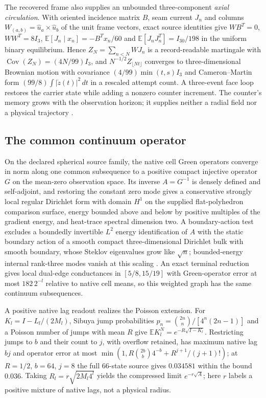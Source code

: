 \documentclass[11pt]{article}
\theoremstyle{definition}
\theoremstyle{remark}
\theoremstyle{plain}
\newcommand{\Ex}{\mathbb{E}}
\begin{document}
The recovered frame also supplies an unbounded three-component \emph{axial
circulation}. With oriented incidence matrix $B$, seam current $J_n$ and
columns $W_{(a,b)}=\hat u_a\times\hat u_b$ of the unit frame vectors, exact
source identities give $WB^T=0$, $WW^T=8I_3$, $\Ex[J_n\mid x_n]=-B^Tx_n/60$
and $\Ex[J_nJ_n^T]=I_{30}/198$ in the uniform binary equilibrium. Hence
$Z_N=\sum_{n<N}WJ_n$ is a record-readable martingale with
$\operatorname{Cov}(Z_N)=(4N/99)I_3$, and
$N^{-1/2}Z_{\lfloor Nt\rfloor}$ converges to three-dimensional Brownian
motion with covariance $(4/99)\min(t,s)I_3$ and Cameron--Martin form
$(99/8)\int|\dot z(t)|^2\,dt$ in a rescaled attempt count. A three-event face
loop restores the carrier state while adding a nonzero counter increment.
The counter's memory grows with the observation horizon; it supplies neither
a radial field nor a physical trajectory \cite{nativeContinuum}.

\subsection{The common continuum operator}
\label{sec:continuum}

On the declared spherical source family, the native cell Green operators
converge in norm along one common subsequence to a positive compact
injective operator $G$ on the mean-zero observation space. Its inverse
$A=G^{-1}$ is densely defined and self-adjoint, and restoring the constant
zero mode gives a conservative strongly local regular Dirichlet form with
domain $H^1$ on the supplied flat-polyhedron comparison surface, energy
bounded above and below by positive multiples of the gradient energy, and
heat-trace spectral dimension two. A boundary-action test excludes a
boundedly invertible $L^2$ energy identification of $A$ with the static
boundary action of a smooth compact three-dimensional Dirichlet bulk with
smooth boundary, whose Steklov eigenvalues grow like $\sqrt n$;
bounded-energy internal rank-three modes vanish at this scaling
\cite{nativeContinuum}. An exact terminal reduction gives local dual-edge
conductances in $[5/8,15/19]$ with Green-operator error at most $182\,2^{-l}$
relative to native cell means, so this weighted graph has the same continuum
subsequences.

A positive native lag readout realizes the Poisson extension. For
$K_l=I-L_l/(2M_l)$, Sibuya jump probabilities
$p_n=\binom{2n}{n}/[4^n(2n-1)]$ and a Poisson number of jumps with mean $R$
give $\Ex K_l^N=e^{-R\sqrt{I-K_l}}$. Restricting jumps to $b$ and their count
to $j$, with overflow retained, has maximum native lag $bj$ and operator
error at most $\min(1,R\binom{2b}{b}4^{-b}+R^{j+1}/(j+1)!)$; at $R=1/2$,
$b=64$, $j=8$ the full 66-state source gives $0.034581$ within the bound
$0.036$. Taking $R_l=r\sqrt{2M_l4^l}$ yields the compressed limit
$e^{-r\sqrt A}$; here $r$ labels a positive mixture of native lags, not a
physical radius.
\end{document}
